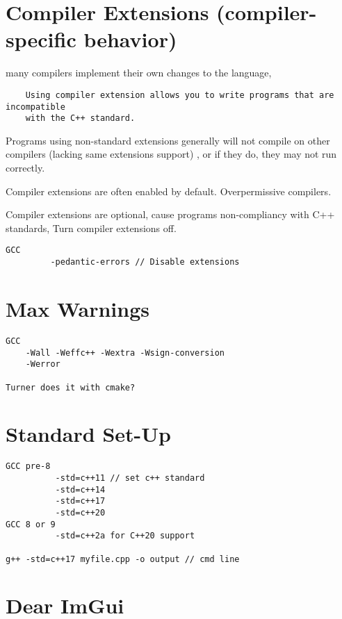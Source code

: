 \section{Compiler Extensions (compiler-specific behavior)}

    many compilers implement their own changes to the language,
    \begin{verbatim}
    Using compiler extension allows you to write programs that are incompatible
    with the C++ standard.
    \end{verbatim}

    Programs using non-standard extensions generally will not compile on other compilers (lacking same extensions support)
    , or if they do, they may not run correctly.

    Compiler extensions are often enabled by default. Overpermissive compilers.

    Compiler extensions are optional, cause programs non-compliancy with C++ standards,
    Turn compiler extensions off.

\begin{verbatim}
GCC
         -pedantic-errors // Disable extensions
\end{verbatim}

\section{Max Warnings}

\begin{verbatim}
GCC 
    -Wall -Weffc++ -Wextra -Wsign-conversion
    -Werror

Turner does it with cmake?
\end{verbatim}

\section{Standard Set-Up}

\begin{verbatim}
GCC pre-8
          -std=c++11 // set c++ standard
          -std=c++14
          -std=c++17
          -std=c++20 
GCC 8 or 9
          -std=c++2a for C++20 support

g++ -std=c++17 myfile.cpp -o output // cmd line
\end{verbatim}

\section{Dear ImGui}

